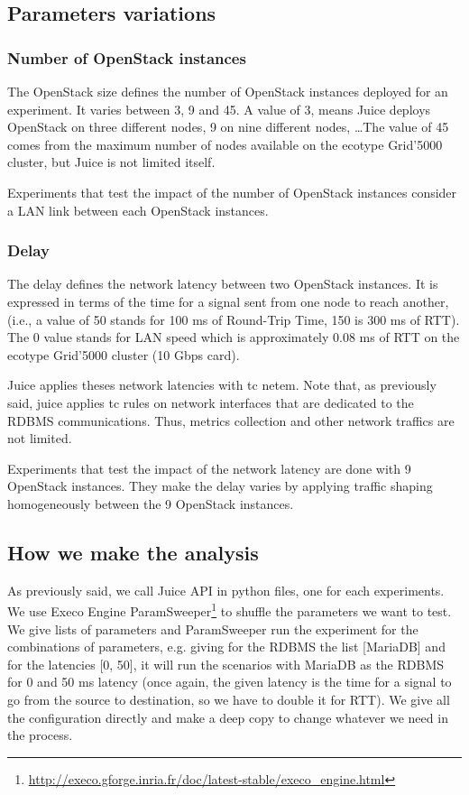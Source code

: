 \subsection{Parameters variations}
\label{subsec:param}
\subsubsection{Number of OpenStack instances}

The OpenStack size defines the number of OpenStack instances deployed for an experiment. It varies between 3, 9 and 45. A value of 3, means Juice deploys OpenStack on three different nodes, 9 on nine different nodes, \dots The value of 45 comes from the maximum number of nodes available on the ecotype Grid’5000 cluster, but Juice is not limited itself.


Experiments that test the impact of the number of OpenStack instances consider a LAN link between each OpenStack instances.

\subsubsection{Delay}

The delay defines the network latency between two OpenStack instances. It is expressed in terms of the time for a signal sent from one node to reach another, (i.e., a value of 50 stands for 100 ms of Round-Trip Time, 150 is 300 ms of RTT). The 0 value stands for LAN speed which is approximately 0.08 ms of RTT on the ecotype Grid’5000 cluster (10 Gbps card).

Juice applies theses network latencies with tc netem. Note that, as previously said, juice applies tc rules on network interfaces that are dedicated to the RDBMS communications. Thus, metrics collection and other network traffics are not limited.

Experiments that test the impact of the network latency are done with 9 OpenStack instances. They make the delay varies by applying traffic shaping homogeneously between the 9 OpenStack instances.

\subsection{How we make the analysis}

As previously said, we call Juice API in python files, one for each experiments. We use Execo Engine ParamSweeper\footnote{\url{http://execo.gforge.inria.fr/doc/latest-stable/execo_engine.html}} to shuffle the parameters we want to test. We give lists of parameters and ParamSweeper run the experiment for the combinations of parameters, e.g. giving for the RDBMS the list [MariaDB] and for the latencies [0, 50], it will run the scenarios with MariaDB as the RDBMS for 0 and 50 ms latency (once again, the given latency is the time for a signal to go from the source to destination, so we have to double it for RTT). We give all the configuration directly and make a deep copy to change whatever we need in the process.

